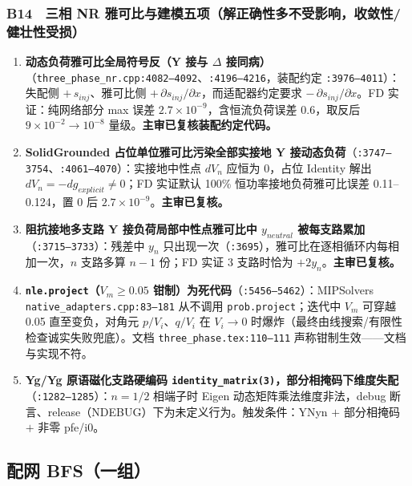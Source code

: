 \documentclass[11pt,a4paper,fontset=fandol]{ctexart}
\newcommand{\file}[1]{\texttt{#1}}
\begin{document}
\subsubsection*{B14　三相 NR 雅可比与建模五项（解正确性多不受影响，收敛性/健壮性受损）}
\begin{enumerate}
  \item \textbf{动态负荷雅可比全局符号反（Y 接与 $\Delta$ 接同病）}（\file{three\_phase\_nr.cpp:4082--4092}、\file{:4196--4216}，装配约定 \file{:3976--4011}）：失配侧 $+\,s_{inj}$、雅可比侧 $+\,\partial s_{inj}/\partial x$，而适配器约定要求 $-\,\partial s_{inj}/\partial x$。FD 实证：纯网络部分 max 误差 $2.7\times10^{-9}$，含恒流负荷误差 0.6，取反后 $9\times10^{-2}\to10^{-8}$ 量级。\textbf{主审已复核装配约定代码。}
  \item \textbf{SolidGrounded 占位单位雅可比污染全部实接地 Y 接动态负荷}（\file{:3747--3754}、\file{:4061--4070}）：实接地中性点 $dV_n$ 应恒为 0，占位 Identity 解出 $dV_n=-dg_{explicit}\neq 0$；FD 实证默认 100\% 恒功率接地负荷雅可比误差 0.11--0.124，置 0 后 $2.7\times10^{-9}$。\textbf{主审已复核。}
  \item \textbf{阻抗接地多支路 Y 接负荷局部中性点雅可比中 $y_{neutral}$ 被每支路累加}（\file{:3715--3733}）：残差中 $y_n$ 只出现一次（\file{:3695}），雅可比在逐相循环内每相加一次，$n$ 支路多算 $n-1$ 份；FD 实证 3 支路时恰为 $+2y_n$。\textbf{主审已复核。}
  \item \textbf{\texttt{nle.project}（$V_m\ge 0.05$ 钳制）为死代码}（\file{:5456--5462}）：MIPSolvers \file{native\_adapters.cpp:83--181} 从不调用 \texttt{prob.project}；迭代中 $V_m$ 可穿越 0.05 直至变负，对角元 $p/V_i$、$q/V_i$ 在 $V_i\to 0$ 时爆炸（最终由线搜索/有限性检查诚实失败兜底）。文档 \file{three\_phase.tex:110--111} 声称钳制生效——文档与实现不符。
  \item \textbf{Yg/Yg 原语磁化支路硬编码 \texttt{identity\_matrix(3)}，部分相掩码下维度失配}（\file{:1282--1285}）：$n=1/2$ 相端子时 Eigen 动态矩阵乘法维度非法，debug 断言、release（NDEBUG）下为未定义行为。触发条件：YNyn $+$ 部分相掩码 $+$ 非零 pfe/i0。
\end{enumerate}

\subsection{配网 BFS（一组）}
\end{document}
